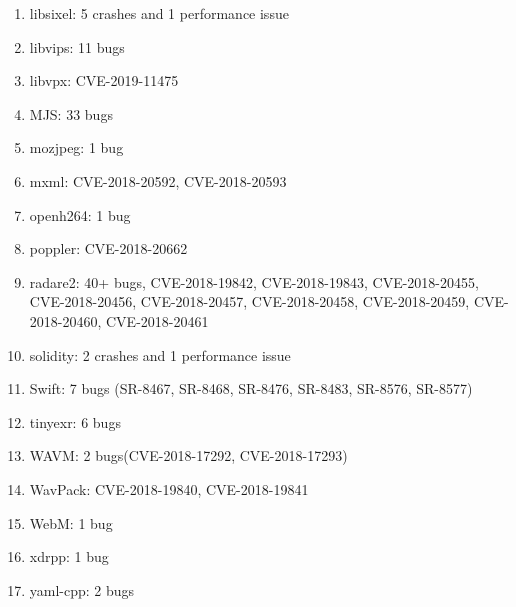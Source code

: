 \documentclass[paper=a4,fontsize=11pt]{article} %
\begin{document}
\pagebreak
\begin{enumerate}[resume]
    \item libsixel: 5 crashes and 1 performance issue
    \item libvips: 11 bugs
    \item libvpx: CVE-2019-11475
    \item MJS: 33 bugs
    \item mozjpeg: 1 bug
    \item mxml: CVE-2018-20592, CVE-2018-20593
    \item openh264: 1 bug
    \item poppler: CVE-2018-20662
    \item radare2: 40+ bugs, CVE-2018-19842, CVE-2018-19843, CVE-2018-20455, CVE-2018-20456, CVE-2018-20457, CVE-2018-20458, CVE-2018-20459, CVE-2018-20460, CVE-2018-20461
    \item solidity: 2 crashes and 1 performance issue
    \item Swift: 7 bugs (SR-8467, SR-8468, SR-8476, SR-8483, SR-8576, SR-8577)
    \item tinyexr: 6 bugs
    \item WAVM: 2 bugs(CVE-2018-17292, CVE-2018-17293)
    \item WavPack: CVE-2018-19840, CVE-2018-19841
    \item WebM: 1 bug
    \item xdrpp: 1 bug
    \item yaml-cpp: 2 bugs
\end{enumerate}
\end{document}
